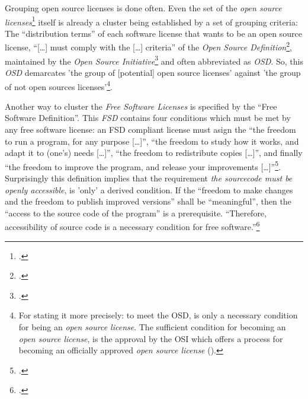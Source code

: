 Grouping open source licenses is done often. Even the set of the \emph{open
source li\-cen\-ses}\footcite[cf.][\nopage wp]{OSI2012b} itself is already a
cluster being established by a set of grouping criteria: The
\enquote{distribution terms} of each software license that wants to be an open
source license, \enquote{[\ldots] must comply with the [\ldots] criteria} of the
\emph{Open Source De\-fi\-ni\-tion}\footcite[cf.][\nopage wp]{OSI2012a}, maintained by
the \emph{Open Source Initiative}\footcite[cf.][\nopage wp]{OSI2012c} and often
abbreviated as \emph{OSD}. So, this \emph{OSD} demarcates 'the group of
[potential] open source licenses' against 'the group of not open sources
licenses'\footnote{For stating it more precisely: to meet the OSD, is only a
necessary condition for being an \emph{open source license}. The sufficient
condition for becoming an \emph{open source license}, is the approval by the OSI
which offers a process for becoming an officially approved \emph{open source
license} (\cite[cf.][\nopage wp.]{OSI2012d}).}.

Another way to cluster the \emph{Free Software Licenses} is specified by the
\enquote{Free Software Definition}. This \emph{FSD} contains four conditions
which must be met by any free software license: an FSD compliant license must
asign the \enquote{the freedom to run a program, for any purpose [\ldots]},
\enquote{the freedom to study how it works, and adapt it to (one's) needs
[\ldots]}, \enquote{the freedom to redistribute copies [\ldots]}, and finally
\enquote{the freedom to improve the program, and release your improvements
[\ldots]}\footcite[cf.][41]{Stallman1996a}. Surprisingly this definition
implies that the requirement \emph{the sourcecode must be openly accessible},
is 'only' a derived condition. If the \enquote{freedom to make changes and the
freedom to publish improved versions} shall be \enquote{meaningful}, then the
\enquote{access to the source code of the program} is a prerequisite.
\enquote{Therefore, accessibility of source code is a necessary condition for
free software.}\footcite[cf.][41]{Stallman1996a}

